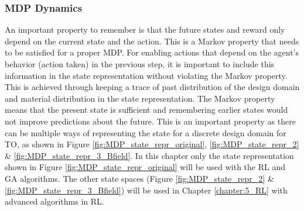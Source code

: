 \subsubsection{MDP Dynamics}
An important property to remember is that the future states and reward only depend on the current state and the action. This is a Markov property that needs to be satisfied for a proper MDP. For enabling actions that depend on the agent's behavior (action taken) in the previous step, it is important to include this information in the state representation without violating the Markov property. This is achieved through keeping a trace of past distribution of the design domain and material distribution in the state representation. The Markov property means that the present state is sufficient and remembering earlier states would not improve predictions about the future. This is an important property as there can be multiple ways of representing the state for a discrete design domain for TO, as shown in Figure \ref{fig:MDP_state_repr_original}, \ref{fig:MDP_state_repr_2} \&  \ref{fig:MDP_state_repr_3_Bfield}. In this chapter only the state representation shown in Figure \ref{fig:MDP_state_repr_original} will be used with the RL and GA algorithms. The other state spaces (Figure \ref{fig:MDP_state_repr_2} \&  \ref{fig:MDP_state_repr_3_Bfield}) will be used in Chapter \ref{chapter:5_RL} with advanced algorithms in RL.

